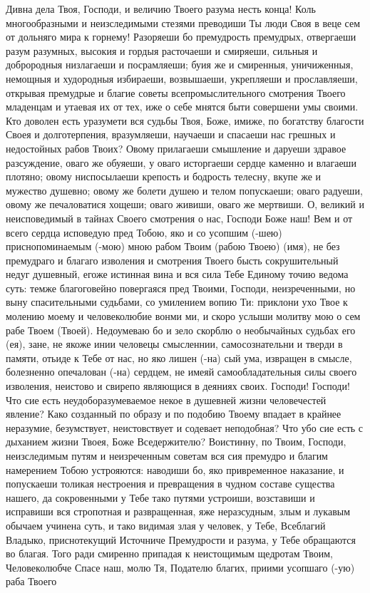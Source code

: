 \mychapterending


\begin{mymulticols}
 


Дивна дела Твоя, Господи, и величию Твоего разума несть конца! Коль многообразными и неизследимыми стезями преводиши Ты люди Своя в веце сем от дольняго мира к горнему! Разоряеши бо премудрость премудрых, отвергаеши разум разумных, высокия и гордыя расточаеши и смиряеши, сильныя и доброродныя низлагаеши и посрамляеши; буия же и смиренныя, уничиженныя, немощныя и худородныя избираеши, возвышаеши, укрепляеши и прославляеши, открывая премудрые и благие советы всепромыслительного смотрения Твоего младенцам и утаевая их от тех, иже о себе мнятся быти совершени умы своими. Кто доволен есть уразумети вся судьбы Твоя, Боже, имиже, по богатству благости Своея и долготерпения, вразумляеши, научаеши и спасаеши нас грешных и недостойных рабов Твоих? Овому прилагаеши смышление и даруеши здравое разсуждение, оваго же обуяеши, у оваго исторгаеши сердце каменно и влагаеши плотяно; овому ниспосылаеши крепость и бодрость телесну, вкупе же и мужество душевно; овому же болети душею и телом попускаеши; оваго радуеши, овому же печаловатися хощеши; оваго живиши, оваго же мертвиши. О, великий и неисповедимый в тайнах Своего смотрения о нас, Господи Боже наш! Вем и от всего сердца исповедую пред Тобою, яко и со усопшим (-шею) приснопоминаемым (-мою) мною рабом Твоим (рабою Твоею) (имя), не без премудраго и благаго изволения и смотрения Твоего бысть сокрушительный недуг душевный, егоже истинная вина и вся сила Тебе Единому точию ведома суть: темже благоговейно повергаяся пред Твоими, Господи, неизреченными, но выну спасительными судьбами, со умилением вопию Ти: приклони ухо Твое к молению моему и человеколюбие вонми ми, и скоро услыши молитву мою о сем рабе Твоем (Твоей). Недоумеваю бо и зело скорблю о необычайных судьбах его (ея), зане, не якоже инии человецы смысленнии, самосознательни и тверди в памяти, отьиде к Тебе от нас, но яко лишен (-на) сый ума, извращен в смысле, болезненно опечалован (-на) сердцем, не имеяй самообладательныя силы своего изволения, неистово и свирепо являющися в деяниях своих. Господи! Господи! Что сие есть неудоборазумеваемое некое в душевней жизни человечестей явление? Како созданный по образу и по подобию Твоему впадает в крайнее неразумие, безумствует, неистовствует и содевает неподобная? Что убо сие есть с дыханием жизни Твоея, Боже Вседержителю? Воистинну, по Твоим, Господи, неизследимым путям и неизреченным советам вся сия премудро и благим намерением Тобою устрояются: наводиши бо, яко привременное наказание, и попускаеши толикая нестроения и превращения в чудном составе существа нашего, да сокровенными у Тебе тако путями устроиши, возставиши и исправиши вся стропотная и развращенная, яже неразсудным, злым и лукавым обычаем учинена суть, и тако видимая злая у человек, у Тебе, Всеблагий Владыко, приснотекущий Источниче Премудрости и разума, у Тебе обращаются во благая. Того ради смиренно припадая к неистощимым щедротам Твоим, Человеколюбче Спасе наш, молю Тя, Подателю благих, приими усопшаго (-ую) раба Твоего 
\end{mymulticols}
